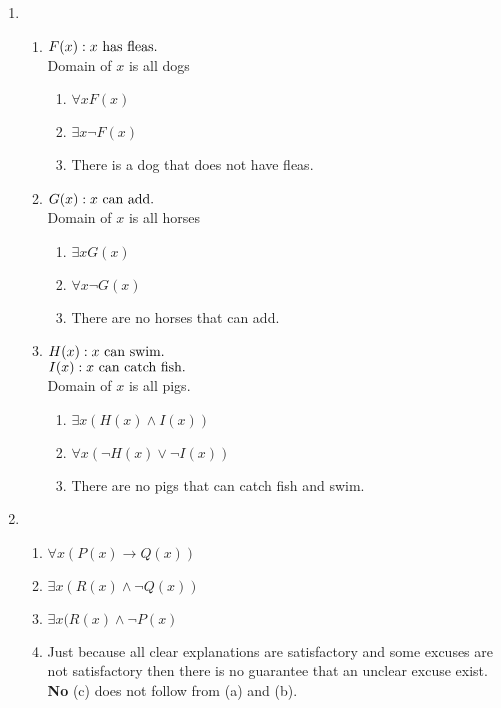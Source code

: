 \documentclass[11pt,a4paper,oneside]{article}
\begin{document}
\begin{enumerate}
\newpage

\setcounter{enumi}{31} %
\item
\begin{enumerate} %
\item \( F(x) : x \textup{ has fleas.} \) \\
      Domain of $x$ is all dogs
\begin{enumerate}
\item \(\forall x F(x) \)
\item \(\exists x \neg F(x) \)
\item There is a dog that does not have fleas.
\end{enumerate} %
\item \( G(x) : x \textup{ can add.} \) \\
      Domain of $x$ is all horses
\begin{enumerate}
\item \(\exists x G(x) \)
\item \(\forall x \neg G(x) \)
\item There are no horses that can add.
\end{enumerate}
\setcounter{enumii}{4} %
\item \( H(x) : x \textup{ can swim.} \) \\
      \( I(x) : x \textup{ can catch fish.} \) \\
      Domain of $x$ is all pigs.
\begin{enumerate}
\item \(\exists x (H(x) \wedge I(x)) \)
\item \(\forall x (\neg H(x) \vee \neg I(x))\)
\item There are no pigs that can catch fish and swim.
\end{enumerate}
\end{enumerate}

\setcounter{enumi}{59}
\item %
\begin{enumerate} %
\item \( \forall x (P(x) \rightarrow Q(x)) \)
\item \( \exists x (R(x) \wedge \neg Q(x)) \)
\item \( \exists x (R(x) \wedge \neg P(x) \)
\item Just because all clear explanations are satisfactory and some excuses are not satisfactory then there is no guarantee that an unclear excuse exist. {\bf No} (c) does not follow from (a) and (b).
\end{enumerate}

\end{enumerate}
\end{document}
